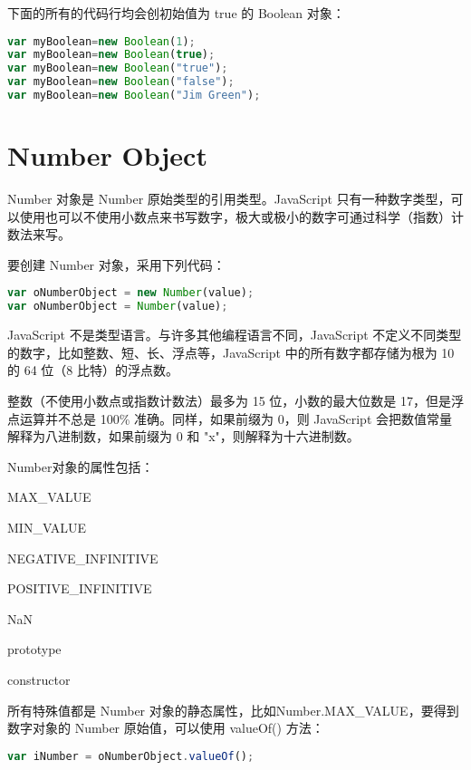 下面的所有的代码行均会创初始值为 true 的 Boolean 对象：


\begin{lstlisting}[language=JavaScript]
var myBoolean=new Boolean(1);
var myBoolean=new Boolean(true);
var myBoolean=new Boolean("true");
var myBoolean=new Boolean("false");
var myBoolean=new Boolean("Jim Green");
\end{lstlisting}

\section{Number Object}


Number 对象是 Number 原始类型的引用类型。JavaScript 只有一种数字类型，可以使用也可以不使用小数点来书写数字，极大或极小的数字可通过科学（指数）计数法来写。

要创建 Number 对象，采用下列代码：

\begin{lstlisting}[language=JavaScript]
var oNumberObject = new Number(value);
var oNumberObject = Number(value);
\end{lstlisting}


JavaScript 不是类型语言。与许多其他编程语言不同，JavaScript 不定义不同类型的数字，比如整数、短、长、浮点等，JavaScript 中的所有数字都存储为根为 10 的 64 位（8 比特）的浮点数。

整数（不使用小数点或指数计数法）最多为 15 位，小数的最大位数是 17，但是浮点运算并不总是 100\% 准确。同样，如果前缀为 0，则 JavaScript 会把数值常量解释为八进制数，如果前缀为 0 和 "x"，则解释为十六进制数。

Number对象的属性包括：

\begin{compactitem}
\item MAX\_VALUE
\item MIN\_VALUE
\item NEGATIVE\_INFINITIVE
\item POSITIVE\_INFINITIVE
\item NaN
\item prototype
\item constructor
\end{compactitem}

所有特殊值都是 Number 对象的静态属性，比如Number.MAX\_VALUE，要得到数字对象的 Number 原始值，可以使用 valueOf() 方法：


\begin{lstlisting}[language=JavaScript]
var iNumber = oNumberObject.valueOf();
\end{lstlisting}

